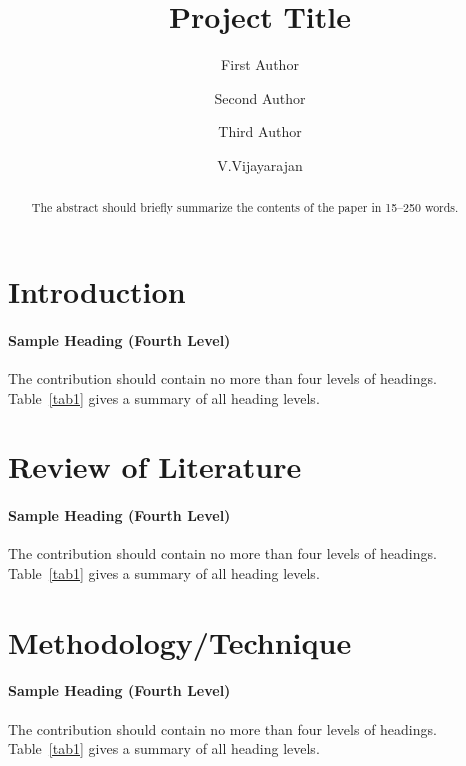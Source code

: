 \documentclass[runningheads]{llncs}
\begin{document}
%
\title{Project Title}
%
%
\author{First Author \and
Second Author 
\and Third Author \and
V.Vijayarajan}
%
%
%
\maketitle              %
%
\begin{abstract}
The abstract should briefly summarize the contents of the paper in
15--250 words.

\end{abstract}
%
%
%
\section{Introduction}

\paragraph{Sample Heading (Fourth Level)}
The contribution should contain no more than four levels of
headings. Table~\ref{tab1} gives a summary of all heading levels.

\section{Review of Literature}

\paragraph{Sample Heading (Fourth Level)}
The contribution should contain no more than four levels of
headings. Table~\ref{tab1} gives a summary of all heading levels.

\section{Methodology/Technique}

\paragraph{Sample Heading (Fourth Level)}
The contribution should contain no more than four levels of
headings. Table~\ref{tab1} gives a summary of all heading levels.
\end{document}
